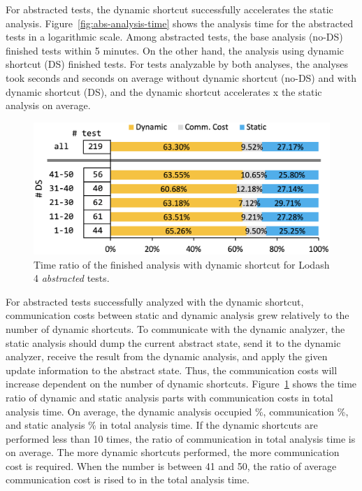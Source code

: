 For abstracted tests, the dynamic shortcut successfully accelerates the static
analysis.  Figure~\ref{fig:abs-analysis-time} shows the analysis time for the
abstracted tests in a logarithmic scale.  Among  abstracted tests,
the base analysis (no-DS) finished  tests within 5 minutes.  On the
other hand, the analysis using dynamic shortcut (DS) finished  tests.
For  tests analyzable by both analyses, the analyses took
 seconds and  seconds on average without dynamic
shortcut (no-DS) and with dynamic shortcut (DS), and the dynamic shortcut
accelerates \textsf{x} the static analysis on average.

\begin{figure}
  \centering
  \includegraphics[width=\linewidth]{img/abs-analysis-ratio}
  \vspace*{-1.5em}
  \caption{Time ratio of the finished analysis with dynamic shortcut for
   Lodash 4 \textit{abstracted} tests.}
  \label{fig:abs-analysis-ratio}
  \vspace*{-1.5em}
\end{figure}

For  abstracted tests successfully analyzed with the dynamic
shortcut, communication costs between static and dynamic analysis grew
relatively to the number of dynamic shortcuts.  To communicate with the
dynamic analyzer, the static analysis should dump the current abstract state,
send it to the dynamic analyzer, receive the result from the dynamic analysis,
and apply the given update information to the abstract state.  Thus, the
communication costs will increase dependent on the number of dynamic shortcuts.
Figure~\ref{fig:abs-analysis-ratio} shows the time ratio of dynamic and static
analysis parts with communication costs in total analysis time.  On average, the
dynamic analysis occupied \%, communication \%, and
static analysis \% in total analysis time.  If the dynamic
shortcuts are performed less than 10 times, the ratio of communication in total
analysis time is  on average.  The more dynamic shortcuts
performed, the more communication cost is required.  When the number is
between 41 and 50, the ratio of average communication cost is rised to
 in the total analysis time.


